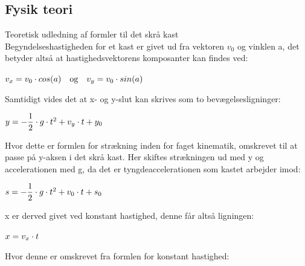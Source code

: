 

\subsection{Fysik teori}
Teoretisk udledning af formler til det skrå kast\\
Begyndelseshastigheden for et kast er givet ud fra vektoren $v_{0}$ og vinklen a, det betyder altså at hastighedsvektorens komposanter kan findes ved:\\

\begin{center}
\begin{math}
\centering
v_{x} = v_{0} \cdot cos(a) \quad \textrm{og} \quad v_{y} = v_{0} \cdot sin(a)
\end{math}
\end{center}

Samtidigt vides det at x- og y-slut kan skrives som to bevægelsesligninger:\\

\begin{center}
\begin{math}
\centering
y = -\dfrac{1}{2} \cdot g \cdot t^{2} + v_{y} \cdot t + y_{0}
\end{math}
\end{center}



Hvor dette er formlen for strækning inden for faget kinematik, omskrevet til at passe på y-aksen i det skrå kast. Her skiftes strækningen ud med y og accelerationen med g, da det er tyngdeaccelerationen som kastet arbejder imod:\\

\begin{center}
\begin{math}
\centering
s = -\dfrac{1}{2} \cdot g \cdot t^{2} + v_{0} \cdot t + s_{0} 
\end{math}
\end{center}

x er derved givet ved konstant hastighed, denne får altså ligningen:\\

\begin{center}
\begin{math}
\centering
x = v_{x} \cdot t
\end{math}
\end{center}

Hvor denne er omskrevet fra formlen for konstant hastighed:\\

